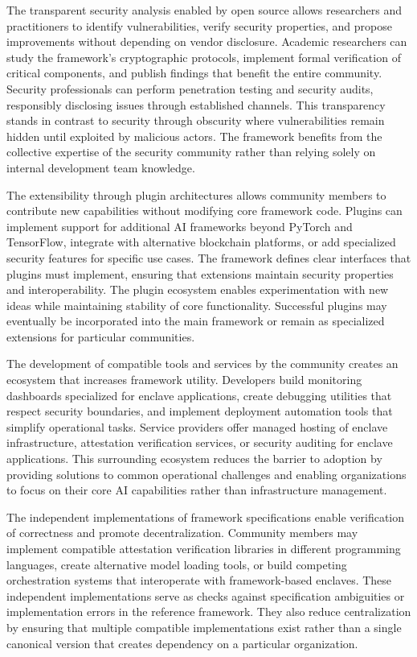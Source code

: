 The transparent security analysis enabled by open source allows researchers and practitioners to identify vulnerabilities, verify security properties, and propose improvements without depending on vendor disclosure. Academic researchers can study the framework's cryptographic protocols, implement formal verification of critical components, and publish findings that benefit the entire community. Security professionals can perform penetration testing and security audits, responsibly disclosing issues through established channels. This transparency stands in contrast to security through obscurity where vulnerabilities remain hidden until exploited by malicious actors. The framework benefits from the collective expertise of the security community rather than relying solely on internal development team knowledge.

The extensibility through plugin architectures allows community members to contribute new capabilities without modifying core framework code. Plugins can implement support for additional AI frameworks beyond PyTorch and TensorFlow, integrate with alternative blockchain platforms, or add specialized security features for specific use cases. The framework defines clear interfaces that plugins must implement, ensuring that extensions maintain security properties and interoperability. The plugin ecosystem enables experimentation with new ideas while maintaining stability of core functionality. Successful plugins may eventually be incorporated into the main framework or remain as specialized extensions for particular communities.

The development of compatible tools and services by the community creates an ecosystem that increases framework utility. Developers build monitoring dashboards specialized for enclave applications, create debugging utilities that respect security boundaries, and implement deployment automation tools that simplify operational tasks. Service providers offer managed hosting of enclave infrastructure, attestation verification services, or security auditing for enclave applications. This surrounding ecosystem reduces the barrier to adoption by providing solutions to common operational challenges and enabling organizations to focus on their core AI capabilities rather than infrastructure management.

The independent implementations of framework specifications enable verification of correctness and promote decentralization. Community members may implement compatible attestation verification libraries in different programming languages, create alternative model loading tools, or build competing orchestration systems that interoperate with framework-based enclaves. These independent implementations serve as checks against specification ambiguities or implementation errors in the reference framework. They also reduce centralization by ensuring that multiple compatible implementations exist rather than a single canonical version that creates dependency on a particular organization.


